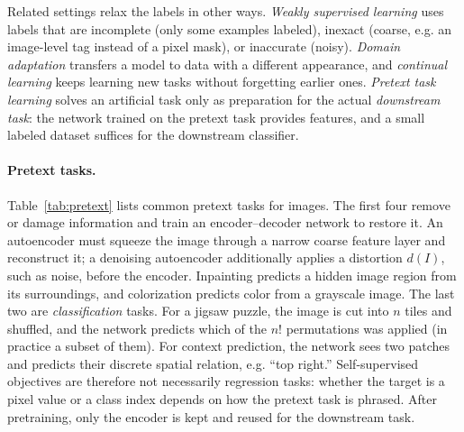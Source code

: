 Related settings relax the labels in other ways. \emph{Weakly supervised
learning} uses labels that are incomplete (only some examples labeled), inexact
(coarse, e.g. an image-level tag instead of a pixel mask), or inaccurate
(noisy). \emph{Domain adaptation} transfers a model to data with a different
appearance, and \emph{continual learning} keeps learning new tasks without
forgetting earlier ones. \emph{Pretext task learning} solves an artificial task
only as preparation for the actual \emph{downstream task}: the network trained
on the pretext task provides features, and a small labeled dataset suffices
for the downstream classifier.

\paragraph{Pretext tasks.}
Table~\ref{tab:pretext} lists common pretext tasks for images. The first four
remove or damage information and train an encoder--decoder network to restore
it. An autoencoder must squeeze the image through a narrow coarse feature layer
and reconstruct it; a denoising autoencoder additionally applies a distortion
$d(I)$, such as noise, before the encoder. Inpainting predicts a hidden image
region from its surroundings, and colorization predicts color from a grayscale
image. The last two are \emph{classification} tasks. For a jigsaw puzzle, the
image is cut into $n$ tiles and shuffled, and the network predicts which of the
$n!$ permutations was applied (in practice a subset of them). For context
prediction, the network sees two patches and predicts their discrete spatial
relation, e.g. ``top right.'' Self-supervised objectives are therefore not
necessarily regression tasks: whether the target is a pixel value or a class
index depends on how the pretext task is phrased. After pretraining, only the
encoder is kept and reused for the downstream task.

